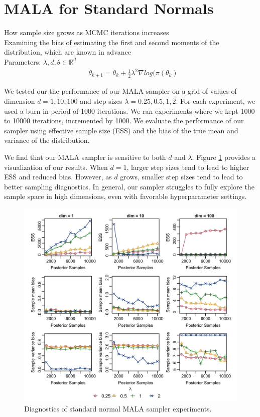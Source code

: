 \documentclass{article}
\begin{document}
\section{MALA for Standard Normals}

How sample size grows as MCMC iterations increases \\
Examining the bias of estimating the first and second moments of the distribution, which are known in advance \\ 



Parameters: $\lambda, d, \theta \in\mathbb{R}^{d}$
\begin{align}
    & \theta_{k+1} = \theta_{k} + \frac{1}{2}\lambda^{2} \nabla log(\pi(\theta_{k}) 
\end{align}

We tested our the performance of our MALA sampler on a grid of values of dimension $d = 1, 10, 100$ and step sizes $\lambda = 0.25, 0.5, 1, 2$.
For each experiment, we used a burn-in period of 1000 iterations.
We ran experiments where we kept 1000 to 10000 iterations, incremented by 1000.
We evaluate the performance of our sampler using effective sample size (ESS) and the bias of the true mean and variance of the distribution.

We find that our MALA sampler is sensitive to both $d$ and $\lambda$.
Figure \ref{fig:mala_std_normal} provides a visualization of our results.
When $d = 1$, larger step sizes tend to lead to higher ESS and reduced bias.
However, as $d$ grows, smaller step sizes tend to lead to better sampling diagnostics.
In general, our sampler struggles to fully explore the sample space in high dimensions, even with favorable hyperparameter settings.

\begin{figure}
\centering
\includegraphics[width=.8\textwidth]{MALA_std_normal/mala_std_normal_diagnostics.png}
\caption{Diagnostics of standard normal MALA sampler experiments.}
\label{fig:mala_std_normal}
\end{figure}
\end{document}

